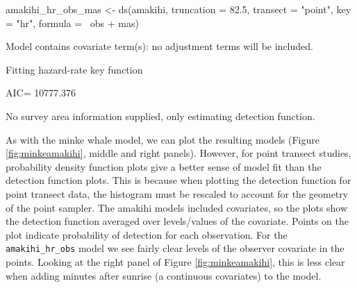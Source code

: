 \documentclass[article]{jss}
\begin{document}
\begin{CodeChunk}
\begin{CodeInput}
amakihi_hr_obs_mas <- ds(amakihi, truncation = 82.5, transect = "point",
                         key = "hr", formula = ~obs + mas)
\end{CodeInput}
\begin{CodeOutput}
Model contains covariate term(s): no adjustment terms will be included.
\end{CodeOutput}
\begin{CodeOutput}
Fitting hazard-rate key function
\end{CodeOutput}
\begin{CodeOutput}
AIC= 10777.376
\end{CodeOutput}
\begin{CodeOutput}
No survey area information supplied, only estimating detection function.
\end{CodeOutput}
\end{CodeChunk}

As with the minke whale model, we can plot the resulting models (Figure
\ref{fig:minkeamakihi}, middle and right panels). However, for point
transect studies, probability density function plots give a better sense
of model fit than the detection function plots. This is because when
plotting the detection function for point transect data, the histogram
must be rescaled to account for the geometry of the point sampler. The
amakihi models included covariates, so the plots show the detection
function averaged over levels/values of the covariate. Points on the
plot indicate probability of detection for each observation. For the
\texttt{amakihi\_hr\_obs} model we see fairly clear levels of the
observer covariate in the points. Looking at the right panel of Figure
\ref{fig:minkeamakihi}, this is less clear when adding minutes after
sunrise (a continuous covariates) to the model.
\end{document}
